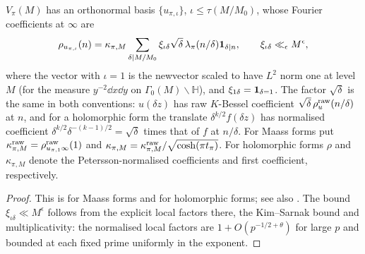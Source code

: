 \documentclass[11pt,colorlinks]{charlie}
\begin{document}
\begin{lemma}\label{lem:oldforms}
$V_\pi(M)$ has an orthonormal basis $\{u_{\pi,\iota}\}$, $\iota\le\tau(M/M_0)$, whose Fourier coefficients at $\infty$ are
\[
 \rho_{u_{\pi,\iota}}(n)=\kappa_{\pi,M}\sum_{\delta\mid M/M_0}\xi_{\iota\delta}\sqrt\delta\,\lambda_\pi(n/\delta)\mathbf{1}_{\delta\mid n},\qquad\xi_{\iota\delta}\ll_\epsilon M^\epsilon,
\]
where the vector with $\iota=1$ is the newvector scaled to have $L^2$ norm one at level $M$ (for the measure $y^{-2}\dd x\dd y$ on $\Gamma_0(M)\backslash\mathbb H$), and $\xi_{1\delta}=\mathbf{1}_{\delta=1}$. The factor $\sqrt\delta$ is the same in both conventions: $u(\delta z)$ has raw $K$-Bessel coefficient $\sqrt\delta\,\rho^{\rm raw}_u(n/\delta)$ at $n$, and for a holomorphic form the translate $\delta^{k/2}f(\delta z)$ has normalised coefficient $\delta^{k/2}\delta^{-(k-1)/2}=\sqrt\delta$ times that of $f$ at $n/\delta$. For Maass forms put $\kappa^{\rm raw}_{\pi,M}=\rho^{\rm raw}_{u_{\pi,1}\infty}(1)$ and $\kappa_{\pi,M}=\kappa^{\rm raw}_{\pi,M}/\sqrt{\cosh(\pi t_\pi)}$. For holomorphic forms $\rho$ and $\kappa_{\pi,M}$ denote the Petersson-normalised coefficients and first coefficient, respectively.
\end{lemma}
\begin{proof}
This is \cite[Lemma~3.15 and (3.16)]{Humphries} for Maass forms and \cite[Theorem~8]{SPY} for holomorphic forms; see also \cite[\S3.5]{KY}. The bound $\xi_{\iota\delta}\ll M^\epsilon$ follows from the explicit local factors there, the Kim--Sarnak bound and multiplicativity: the normalised local factors are $1+O(p^{-1/2+\theta})$ for large $p$ and bounded at each fixed prime uniformly in the exponent.
\end{proof}
\end{document}
